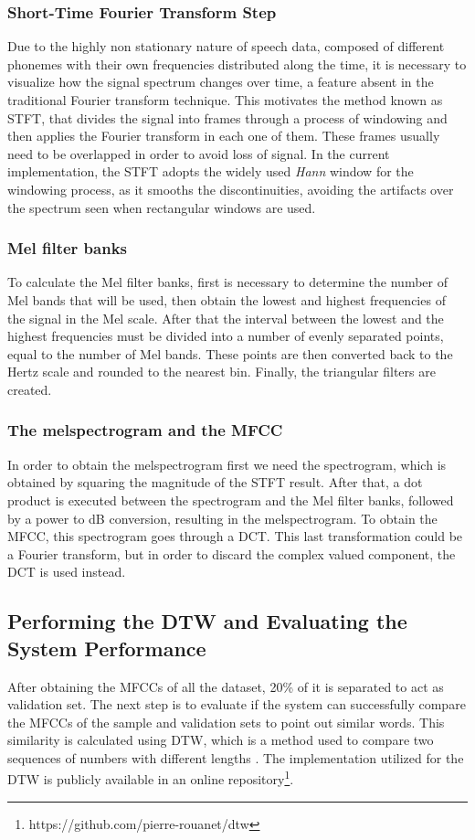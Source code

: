 \documentclass[conference]{IEEEtran}
\begin{document}
\subsubsection{Short-Time Fourier Transform Step}

Due to the highly non stationary nature of speech data, composed of different 
phonemes with their own frequencies distributed along the time, it is necessary
to visualize how the signal spectrum changes over time, a feature 
absent in the traditional Fourier transform technique. This motivates the method 
known as \ac{STFT}, that divides the signal into frames through a process of 
windowing and then applies the Fourier transform in each one of them. These 
frames usually need to be overlapped in order to avoid loss of signal.
In the current implementation, the \ac{STFT} adopts the widely used 
\textit{Hann} window for the windowing process, as it smooths the discontinuities, 
avoiding the artifacts over the spectrum seen when rectangular windows are used.

\subsubsection{Mel filter banks}
To calculate the Mel filter banks, first is necessary to determine the number of 
Mel bands that will be used, then obtain the lowest and highest frequencies of 
the signal in the Mel scale. After that the interval between the lowest and the 
highest frequencies must be divided into a number of evenly separated points, equal 
to the number of Mel bands. These points are then converted back to the Hertz 
scale and rounded to the nearest bin. Finally, the triangular filters are created.

\subsubsection{The melspectrogram and the MFCC}
In order to obtain the melspectrogram first we need the spectrogram, which is obtained
by squaring the magnitude of the \ac{STFT} result. After that, a dot product is executed 
between the spectrogram and the Mel filter banks, followed by a power to dB conversion, 
resulting in the melspectrogram. To obtain the \ac{MFCC}, this spectrogram goes through
a \ac{DCT}. This last transformation could be a Fourier transform, but in order to discard
the complex valued component, the \ac{DCT} is used instead.
 
\subsection{Performing the DTW and Evaluating the System Performance}
After obtaining the \acp{MFCC} of all the dataset, 20\% of it is separated to act as 
validation set. The next step is to evaluate if the system can successfully compare the 
\acp{MFCC} of the sample and validation sets to point out similar words. This similarity
is calculated using \ac{DTW}, which is a method used to compare two sequences of numbers with 
different lengths \cite{sakoe1978dynamic}. The implementation utilized for the \ac{DTW} 
is publicly available in an online repository\footnote{https://github.com/pierre-rouanet/dtw}.
\end{document}
